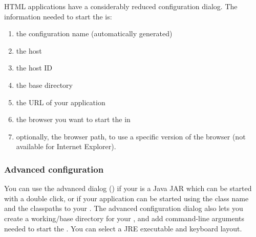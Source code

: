 HTML applications have a considerably reduced configuration dialog. The information needed to start the \gdaut{} is:
\begin{enumerate}
\item the \gdaut{} configuration name (automatically generated)
\item the \gdserver{} host
\item the \gdserver{} host\gdaut{} ID
\item the base directory
\item the URL of your application
\item the browser you want to start the \gdaut{} in
\item optionally, the browser path, to use a specific version of the browser (not available for Internet Explorer). 
\end{enumerate}


\subsubsection{Advanced \gdaut{} configuration}
\label{AdvancedAUTConfig}

You can use the advanced dialog () if your \gdaut{} is a Java JAR which can be started with a double click, or if your application can be started using the class name and the classpaths to your \gdaut{}.  The advanced configuration dialog also lets you create a working/base directory for your \gdaut{}, and add command-line arguments needed to start the \gdaut{}. You can select a JRE executable and keyboard layout.

